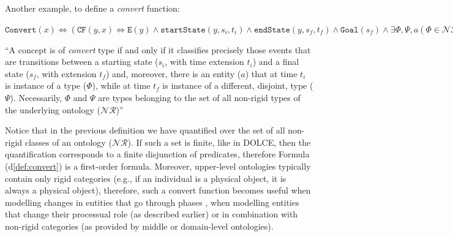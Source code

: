 \documentclass[sw]{iosart2x}
\newcommand{\bflist}{\begin{list}{}{\setlength{\topsep}{2mm}\setlength{\partopsep}{0mm}\setlength{\parsep}{0mm}\setlength{\leftmargin}{9mm}\setlength{\labelwidth}{8mm}}}
\newcommand{\eflist}{\end{list}}
\newcommand{\DefLabel}{\textrm{d}}
\newcounter{cntdef}
\newcommand{\mydf}[1]{\refstepcounter{cntdef}\begin{small}{\bf \DefLabel\thecntdef\label{def:#1}}\end{small}}
\newcommand{\mytext}[1]{``#1''}
\newcommand{\refdf}[1]{({\DefLabel}\ref{#1})}
\newcommand{\generalStyle}[1]{\texttt{#1}}
\newcommand{\biRel}[3]{\generalStyle{#1}(#2,#3)}
\newcommand{\uniRel}[2]{\generalStyle{#1}(#2)}
\newcommand{\triRel}[4]{\generalStyle{#1}(#2,#3,#4)}
\newcommand{\myiff}{\Longleftrightarrow}
\newcommand{\DOLCE}{\textsc{DOLCE}\xspace} %
\newcommand{\DOLCEEvent}[1]{\uniRel{{E}}{#1}}
\newcommand{\DOLCEPC}[3]{\triRel{{PC}}{#1}{#2}{#3}}
\newcommand{\DOLCECLbyBinary}[2]{\biRel{CF}{#1}{#2}}
\newcommand{\Goal}[1]{\uniRel{Goal}{#1}}
\newcommand{\Convert}[1]{\uniRel{Convert}{#1}}
\newcommand{\sState}[3]{\triRel{startState}{#1}{#2}{#3}}
\newcommand{\eState}[3]{\triRel{endState}{#1}{#2}{#3}}
\begin{document}

Another example, to define a \textit{convert} function: 
\bflist
  \item[\mydf{convert}] $ \Convert{x} \myiff (\DOLCECLbyBinary{y}{x} \myiff \DOLCEEvent{y} \land \sState{y}{s_i}{t_i} \land \eState{y}{s_f}{t_f} \land \Goal{s_f} \land \exists \Phi,\Psi,a (\Phi\in\mathcal{NR} \land \Psi\in\mathcal{NR} \land \Psi\cap\Phi = \emptyset \land  \DOLCEPC{a}{s_i}{t_i} \land \DOLCEPC{a}{s_f}{t_f} \land \Phi(a,t_i) \land \Psi(a,t_f))) $ 
  \item[] \mytext{A concept is of \textit{convert} type if and only if it classifies precisely those events that are transitions between a starting state ($s_i$, with time extension $t_i$) and a final state ($s_f$, with extension $t_f$) and, moreover, there is an entity ($a$) that at time $t_i$ is instance of a type ($\Phi$), while at time $t_f$ is instance of a different, disjoint, type ($\Psi$). Necessarily, $\Phi$ and $\Psi$ are types belonging to the set of all non-rigid types of the underlying ontology ($\mathcal{NR}$)}
\eflist 
Notice that in the previous definition we have quantified over the set of all non-rigid classes of an ontology ($\mathcal{NR}$). 
If such a set is finite, like in \DOLCE, then the quantification corresponds to a finite disjunction of predicates, therefore Formula \refdf{def:convert} is a first-order formula.
Moreover, upper-level ontologies typically contain only rigid categories (e.g., if an individual is a physical object, it is always a physical object), therefore, such a convert function becomes useful when modelling changes in entities that go through phases \cite{guarinoOverviewOntoClean2009}, when modelling entities that change their processual role (as described earlier) or in combination with non-rigid categories (as provided by middle or domain-level ontologies).
\end{document}
